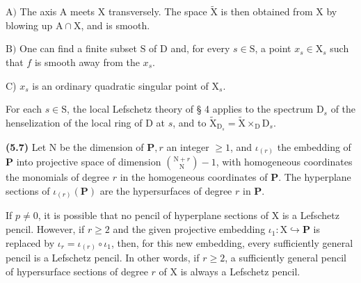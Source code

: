 \documentclass[10pt,leqno]{article}
\begin{document}
\noindent \(\mathrm{A})\) The axis \(\mathrm{A}\) meets \(\mathrm{X}\) transversely. The space \(\widetilde{\mathrm{X}}\) is then obtained from \(\mathrm{X}\) by blowing up \(\mathrm{A}\cap \mathrm{X}\), and is smooth.\par

\clearpage

\label{physical-21}

\noindent \(\mathrm{B})\) One can find a finite subset \(\mathrm{S}\) of \(\mathrm{D}\) and, for every \(s\in \mathrm{S}\), a point \(x_{s}\in \mathrm{X}_{s}\) such that \(f\) is smooth away from the \(x_{s}\).\par

\noindent C) \(x_{s}\) is an ordinary quadratic singular point of \(\mathrm{X}_{s}\).\par

\noindent For each \(s\in \mathrm{S}\), the local Lefschetz theory of § 4 applies to the spectrum \(\mathrm{D}_{s}\) of the henselization of the local ring of \(\mathrm{D}\) at \(s\), and to \(\widetilde{\mathrm{X}}_{\mathrm{D}_{s}}=\widetilde{\mathrm{X}}\times _{\mathrm{D}} \mathrm{D}_{s}\).\par

\noindent \textbf{(5.7)} Let \(\mathrm{N}\) be the dimension of \(\mathbf{P}, r\) an integer \(\geq 1\), and \(\iota _{(r)}\) the embedding of \(\mathbf{P}\) into projective space of dimension \(\binom{\mathrm{N}+r}{\mathrm{N}}- 1\), with homogeneous coordinates the monomials of degree \(r\) in the homogeneous coordinates of \(\mathbf{P}\). The hyperplane sections of \(\iota _{(r)}(\mathbf{P})\) are the hypersurfaces of degree \(r\) in \(\mathbf{P}\).\par

\noindent If \(p\ne 0\), it is possible that no pencil of hyperplane sections of \(\mathrm{X}\) is a Lefschetz pencil. However, if \(r\geq 2\) and the given projective embedding \(\iota _{1}:\mathrm{X}\hookrightarrow \mathbf{P}\) is replaced by \(\iota _{r}=\iota _{(r)}\circ \iota _{1}\), then, for this new embedding, every sufficiently general pencil is a Lefschetz pencil. In other words, if \(r\geq 2\), a sufficiently general pencil of hypersurface sections of degree \(r\) of \(\mathrm{X}\) is always a Lefschetz pencil.\par
\end{document}

